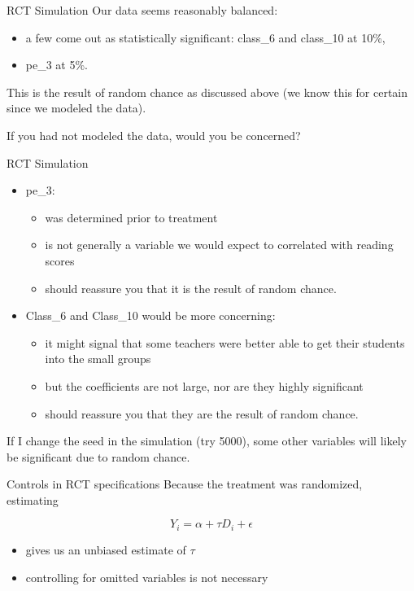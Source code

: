 \documentclass[
  ignorenonframetext,
]{beamer}
\begin{document}
\begin{frame}{RCT Simulation}
\protect\hypertarget{rct-simulation-11}{}
Our data seems reasonably balanced:

\begin{itemize}
\item
  a few come out as statistically significant: class\_6 and class\_10 at
  10\%,
\item
  pe\_3 at 5\%.
\end{itemize}

This is the result of random chance as discussed above (we know this for
certain since we modeled the data).

If you had not modeled the data, would you be concerned?
\end{frame}

\begin{frame}{RCT Simulation}
\protect\hypertarget{rct-simulation-12}{}
\begin{itemize}
\item
  pe\_3:

  \begin{itemize}
  \item
    was determined prior to treatment
  \item
    is not generally a variable we would expect to correlated with
    reading scores
  \item
    should reassure you that it is the result of random chance.
  \end{itemize}
\item
  Class\_6 and Class\_10 would be more concerning:

  \begin{itemize}
  \item
    it might signal that some teachers were better able to get their
    students into the small groups
  \item
    but the coefficients are not large, nor are they highly significant
  \item
    should reassure you that they are the result of random chance.
  \end{itemize}
\end{itemize}

If I change the seed in the simulation (try 5000), some other variables
will likely be significant due to random chance.
\end{frame}

\begin{frame}{Controls in RCT specifications}
\protect\hypertarget{controls-in-rct-specifications}{}
Because the treatment was randomized, estimating

\[
Y_i=\alpha+\tau D_i+\epsilon
\]

\begin{itemize}
\item
  gives us an unbiased estimate of \(\tau\)
\item
  controlling for omitted variables is not necessary
\end{itemize}
\end{frame}
\end{document}
